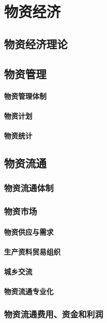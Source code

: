 \documentclass[UTF8]{../../RepresentationUniverse}
\begin{document}
\chapter{物资经济}
\section{物资经济理论}
\section{物资管理}
    \subsubsection{物资管理体制}
    \subsubsection{物资计划}
    \subsubsection{物资统计}
\section{物资流通}
    \subsection{物资流通体制}
    \subsection{物资市场}
        \subsubsection{物资供应与需求}
        \subsubsection{生产资料贸易组织}
        \subsubsection{城乡交流}
        \subsubsection{物资流通专业化}
    \subsection{物资流通费用、资金和利润}
\end{document}
